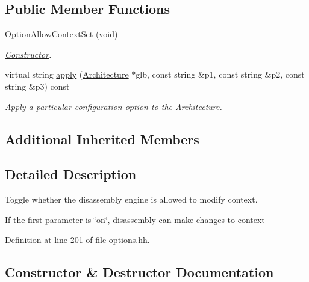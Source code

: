 \subsection*{Public Member Functions}
\begin{DoxyCompactItemize}
\item 
\mbox{\hyperlink{class_option_allow_context_set_a20d7a6bda4350b0895c48eae99606c52}{Option\+Allow\+Context\+Set}} (void)
\begin{DoxyCompactList}\small\item\em \mbox{\hyperlink{class_constructor}{Constructor}}. \end{DoxyCompactList}\item 
virtual string \mbox{\hyperlink{class_option_allow_context_set_aff2666342d40ad18914039177a08c666}{apply}} (\mbox{\hyperlink{class_architecture}{Architecture}} $\ast$glb, const string \&p1, const string \&p2, const string \&p3) const
\begin{DoxyCompactList}\small\item\em Apply a particular configuration option to the \mbox{\hyperlink{class_architecture}{Architecture}}. \end{DoxyCompactList}\end{DoxyCompactItemize}
\subsection*{Additional Inherited Members}


\subsection{Detailed Description}
Toggle whether the disassembly engine is allowed to modify context. 

If the first parameter is \char`\"{}on\char`\"{}, disassembly can make changes to context 

Definition at line 201 of file options.\+hh.



\subsection{Constructor \& Destructor Documentation}
\mbox{\label{class_option_allow_context_set_a20d7a6bda4350b0895c48eae99606c52}} 
